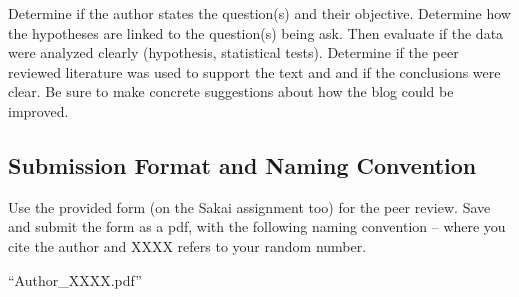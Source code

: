 \documentclass{tufte-handout}\usepackage[]{graphicx}\usepackage[]{color}
\begin{document}
Determine if the author states the question(s) and their objective. Determine how the hypotheses are linked to the question(s) being ask. Then evaluate if the data were analyzed clearly (hypothesis, statistical tests). Determine if the peer reviewed literature was used to support the text and and if the conclusions were clear. Be sure to make concrete suggestions about how the blog could be improved. 

\subsection{Submission Format and Naming Convention}

Use the provided form (on the Sakai assignment too) for the peer review. Save and submit the form as a pdf, with the following naming convention -- where you cite the author and XXXX refers to your random number.

\smallskip

\noindent ``Author\_XXXX.pdf''
\bigskip



\end{document}
